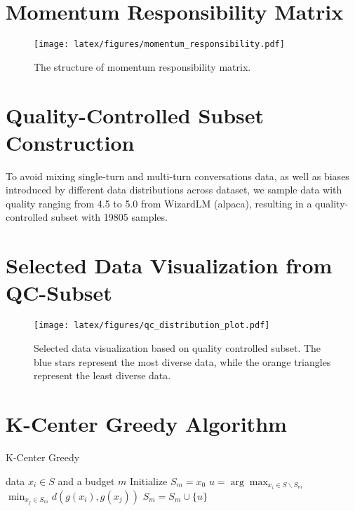 \section{Momentum Responsibility Matrix}
\label{appendix: momentum-responsibility-matrix}

\begin{figure}[hbtp]
\texttt{[image: latex/figures/momentum\_responsibility.pdf]}
\caption{The structure of momentum responsibility matrix.}
\label{fig: historical information}
\end{figure}


\section{Quality-Controlled Subset Construction}
\label{appendix: qc construction}

To avoid mixing single-turn and multi-turn conversations data, as well as biases introduced by different data distributions across dataset, we sample data with quality ranging from 4.5 to 5.0 from WizardLM (alpaca), resulting in a quality-controlled subset with 19805 samples. 

\section{Selected Data Visualization from QC-Subset}

\begin{figure}[htbp]
\begin{center}
\texttt{[image: latex/figures/qc\_distribution\_plot.pdf]}
\end{center}
\caption{Selected data visualization based on quality controlled subset. The blue stars represent the most diverse data, while the orange triangles represent the least diverse data.}
\label{fig: qc_diversity}
\end{figure}

\newpage

\section{K-Center Greedy Algorithm}

\begin{algorithm}
\caption{K-Center Greedy}\label{alg:kcentergreedy}
\begin{algorithmic}[1]
\Require data $x_i\in S$ and a budget $m$
\State Initialize $S_m=x_0$
\Repeat
\State $u=\arg\operatorname*{max}_{x_i\in S\backslash S_m}$
\Statex
\quad\quad\quad\quad\quad\quad\quad\quad$\operatorname*{min}_{x_j\in S_m}d(g(x_i),g(x_j))$
\State $S_m = S_m\cup \{u\}$
\State {}
\end{algorithmic}
\end{algorithm}

